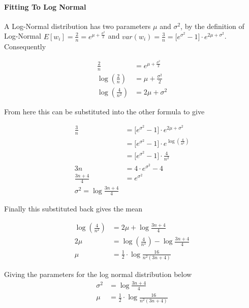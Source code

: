\paragraph{Fitting To Log Normal}

A Log-Normal distribution has two parameters $\mu$ and $\sigma^2$, by the definition of Log-Normal $E[w_i] = \frac{2}{n} = e^{\mu + \frac{\sigma^2}{2}}$ and $var(w_i) = \frac{3}{n} = \big[e^{\sigma^2} - 1\big] \cdot e^{2\mu + \sigma^2}$. Consequently

\begin{align*}
\frac{2}{n} &= e^{\mu + \frac{\sigma^2}{2}}\\
\log(\frac{2}{n}) &= \mu + \frac{\sigma^2}{2}\\
\log(\frac{4}{n^2}) &= 2\mu + \sigma^2
\end{align*}

From here this can be substituted into the other formula to give

\begin{align*}
\frac{3}{n} &= \big[e^{\sigma^2} - 1\big] \cdot e^{2\mu + \sigma^2}\\
&= \big[e^{\sigma^2} - 1\big] \cdot e^{\log(\frac{4}{n^2})}\\
&= \big[e^{\sigma^2} - 1\big] \cdot \frac{4}{n^2}\\
3n &= 4 \cdot e^{\sigma^2} - 4\\
\frac{3n + 4}{4} &= e^{\sigma^2}\\
\sigma^2 = \log \frac{3n + 4}{4}
\end{align*}

Finally this substituted back gives the mean

\begin{align*}
\log(\frac{4}{n^2}) &= 2\mu + \log \frac{3n + 4}{4}\\
2\mu &= \log(\frac{4}{n^2}) - \log \frac{3n + 4}{4}\\
\mu &= \frac{1}{2} \cdot \log \frac{16}{n^2(3n + 4)}
\end{align*}

Giving the parameters for the log normal distribution below
\begin{align}
\sigma^2 &= \log \frac{3n + 4}{4}\\
\mu &= \frac{1}{2} \cdot \log \frac{16}{n^2(3n + 4)}
\end{align}


